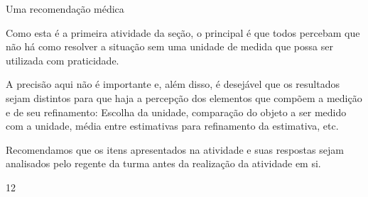 \begin{sugestions}{Uma recomendação médica}
{
Como esta é a primeira atividade da seção, o principal é que todos percebam que não há como resolver a situação sem uma unidade de medida que possa ser utilizada com praticidade.

A precisão aqui não é importante e, além disso, é desejável que os resultados sejam distintos para que haja a percepção dos elementos que compõem a medição e de seu refinamento: Escolha da unidade, comparação do objeto a ser medido com a unidade, média entre estimativas para refinamento da estimativa, etc.

Recomendamos que os itens apresentados na atividade e suas respostas sejam analisados pelo regente da turma antes da realização da atividade em si.
}{1}{2}
\end{sugestions}
